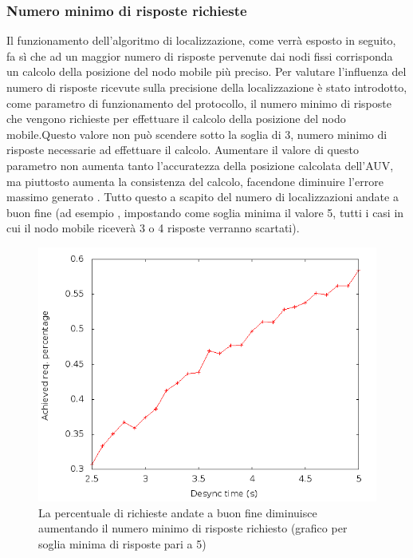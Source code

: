 \documentclass[Lau,binding=0.6cm]{sapthesis}
\begin{document}
\subsubsection{Numero minimo di risposte richieste}
Il funzionamento dell'algoritmo di localizzazione, come verrà esposto in seguito, fa sì che ad un maggior numero di risposte pervenute dai nodi fissi corrisponda un calcolo della posizione del nodo mobile più preciso.
Per valutare l'influenza del numero di risposte ricevute sulla precisione della localizzazione è stato introdotto, come parametro di funzionamento del protocollo, il numero minimo di risposte che vengono richieste per effettuare il calcolo della posizione del nodo mobile.\newline Questo valore non può scendere sotto la soglia di 3, numero minimo di risposte necessarie ad effettuare il calcolo. 
Aumentare il valore di questo parametro non aumenta tanto l'accuratezza della posizione calcolata dell'AUV, ma piuttosto aumenta la consistenza del calcolo, facendone diminuire l'errore massimo generato . Tutto questo a scapito  del numero di localizzazioni andate a buon fine (ad esempio , impostando come soglia minima il valore 5, tutti i casi in cui il nodo mobile riceverà 3 o 4  risposte verranno scartati).\newline
\begin{figure}[H]
    \centering
    \includegraphics[scale=0.5]{achievedlochexagon6nodescutoff4req5preempt0droponepoint0speed1.png}
    \caption{La percentuale di richieste andate a buon fine diminuisce aumentando il numero minimo di risposte richiesto (grafico per soglia minima di risposte pari a 5)}
\end{figure}
\end{document}
